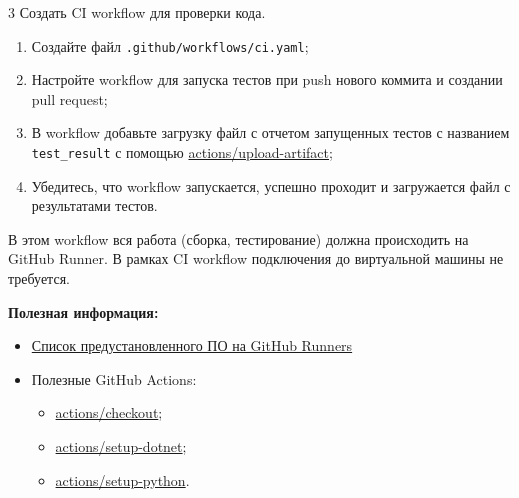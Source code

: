 \documentclass[12pt,a4paper]{article}
\begin{document}
\begin{task}{3}
    Создать CI workflow для проверки кода.
    
    \begin{enumerate}
        \item Создайте файл \texttt{.github/workflows/ci.yaml};
        \item Настройте workflow для запуска тестов при push нового коммита и создании pull request;
        \item В workflow добавьте загрузку файл с отчетом запущенных тестов с названием \texttt{test\_result} с помощью
            \href{https://github.com/actions/upload-artifact}{actions/upload-artifact};
        \item Убедитесь, что workflow запускается, успешно проходит и загружается файл с результатами тестов.
    \end{enumerate}

    В этом workflow вся работа (сборка, тестирование) должна происходить на GitHub Runner.
    В рамках CI workflow подключения до виртуальной машины не требуется.

    \textbf{Полезная информация:}
    \begin{itemize}
        \item \href{https://github.com/actions/runner-images?tab=readme-ov-file#available-images}{Список предустановленного ПО на GitHub Runners}
        \item Полезные GitHub Actions: 
        \begin{itemize}
            \item \href{https://github.com/actions/checkout}{actions/checkout};
            \item \href{https://github.com/actions/setup-dotnet}{actions/setup-dotnet};
            \item \href{https://github.com/actions/setup-python}{actions/setup-python}.
        \end{itemize}
    \end{itemize}
\end{task}
\end{document}
